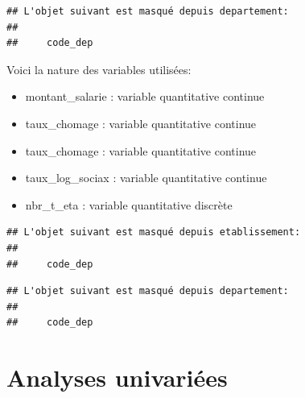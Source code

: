 \documentclass[mstat,12pt]{unswthesis}
\begin{document}
\begin{verbatim}
## L'objet suivant est masqué depuis departement:
## 
##     code_dep
\end{verbatim}

Voici la nature des variables utilisées:

\medskip

\begin{itemize}
\tightlist
\item
  montant\_salarie : variable quantitative continue
\end{itemize}

\medskip

\begin{itemize}
\tightlist
\item
  taux\_chomage : variable quantitative continue
\end{itemize}

\medskip

\begin{itemize}
\tightlist
\item
  taux\_chomage : variable quantitative continue
\end{itemize}

\medskip

\begin{itemize}
\tightlist
\item
  taux\_log\_sociax : variable quantitative continue
\end{itemize}

\medskip

\begin{itemize}
\tightlist
\item
  nbr\_t\_eta : variable quantitative discrète
\end{itemize}

\bigskip

\begin{verbatim}
## L'objet suivant est masqué depuis etablissement:
## 
##     code_dep
\end{verbatim}

\begin{verbatim}
## L'objet suivant est masqué depuis departement:
## 
##     code_dep
\end{verbatim}

\section{Analyses univariées}\label{analyses-univariuxe9es}
\end{document}

